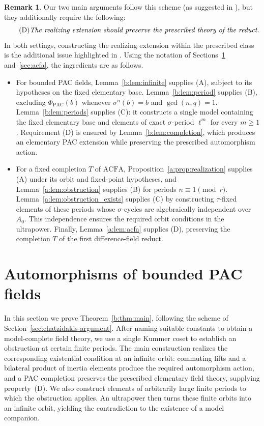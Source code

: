 \documentclass[11pt,a4paper]{amsart}
\renewcommand{\ge}{\geqslant}
\theoremstyle{definition}
\newtheorem{remark}[theorem]{Remark}
\newcommand{\ACFA}{\mathrm{ACFA}}
\begin{document}
\begin{remark}
Our two main arguments follow this scheme (as suggested in \cite[Remark~1.12]{Survey}), but they additionally require the following:
\begin{equation}
\tag{D}
\text{\emph{The realizing extension should preserve the prescribed theory of the reduct.}}
\end{equation}
In both settings, constructing the realizing extension within
the prescribed class is the additional issue highlighted in \cite[Remark~1.12]{Survey}. Using the notation of Sections~\ref{sec:bounded}
and~\ref{sec:acfa}, the ingredients are as follows.

\begin{itemize}
\item For bounded PAC fields, Lemma~\ref{b:lem:infinite}
supplies (A), subject to its hypotheses on the fixed elementary
base. Lemma~\ref{b:lem:period} supplies (B), excluding
$\Phi_{\mathrm{PAC}}(b)$ whenever $\sigma^n(b)=b$ and
$\gcd(n,q)=1$. Lemma~\ref{b:lem:periods} supplies (C):
it constructs a single model containing the fixed elementary
base and elements of exact $\sigma$-period $\ell^m$ for every
$m\ge1$.  Requirement (D) is ensured by Lemma~\ref{b:lem:completion},
which produces an elementary PAC extension while preserving
the prescribed automorphism action.

\item For a fixed completion $T$ of $\ACFA$,
Proposition~\ref{a:prop:realization} supplies (A) under its
orbit and fixed-point hypotheses, and
Lemma~\ref{a:lem:obstruction} supplies (B) for periods
$n\equiv1\pmod r$.
Lemma~\ref{a:lem:obstruction_exists} supplies (C) by constructing
$\tau$-fixed elements of these periods whose $\sigma$-cycles
are algebraically independent over $A_0$.
This independence ensures the required orbit conditions
in the ultrapower.
Finally, Lemma~\ref{a:lem:acfa} supplies (D), preserving
the completion $T$ of the first difference-field reduct.
\end{itemize}
\end{remark}




\section{Automorphisms of bounded PAC fields}\label{sec:bounded}

In this section we prove Theorem~\ref{b:thm:main}, following
the scheme of Section~\ref{sec:chatzidakis-argument}.
After naming suitable constants to obtain a model-complete
field theory, we use a single Kummer coset to establish an
obstruction at certain finite periods. The main construction
realizes the corresponding existential condition at an
infinite orbit: commuting lifts and a bilateral product of
inertia elements produce the required automorphism action,
and a PAC completion preserves the prescribed elementary
field theory, supplying property~(D).
We also construct elements of arbitrarily large finite
periods to which the obstruction applies.
An ultrapower then turns these finite orbits into an
infinite orbit, yielding the contradiction to the existence
of a model companion.
\end{document}
